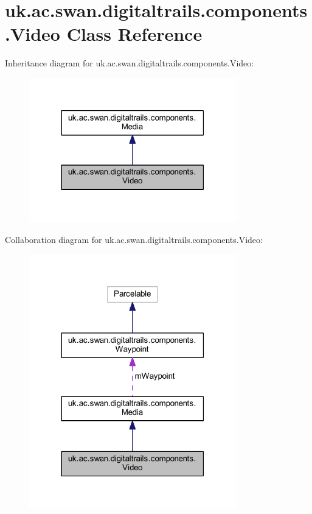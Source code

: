 \hypertarget{classuk_1_1ac_1_1swan_1_1digitaltrails_1_1components_1_1_video}{\section{uk.\+ac.\+swan.\+digitaltrails.\+components.\+Video Class Reference}
\label{classuk_1_1ac_1_1swan_1_1digitaltrails_1_1components_1_1_video}
}


Inheritance diagram for uk.\+ac.\+swan.\+digitaltrails.\+components.\+Video\+:\nopagebreak
\begin{figure}[H]
\begin{center}
\leavevmode
\includegraphics[width=255pt]{classuk_1_1ac_1_1swan_1_1digitaltrails_1_1components_1_1_video__inherit__graph}
\end{center}
\end{figure}


Collaboration diagram for uk.\+ac.\+swan.\+digitaltrails.\+components.\+Video\+:\nopagebreak
\begin{figure}[H]
\begin{center}
\leavevmode
\includegraphics[width=255pt]{classuk_1_1ac_1_1swan_1_1digitaltrails_1_1components_1_1_video__coll__graph}
\end{center}
\end{figure}

